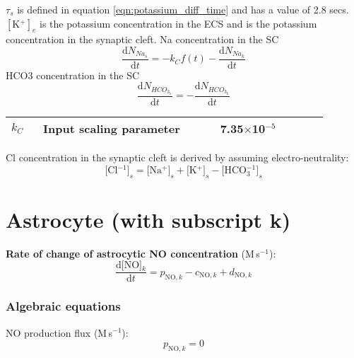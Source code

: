 \documentclass[fleqn]{report}
\numberwithin{equation}{section}
\numberwithin{equation}{section}
\newcommand{\Nas}{\text{[Na$^+]_{s}$}}
\newcommand{\K}{\text{K$^+$}}
\newcommand{\Ks}{\text{[K$^{+}]_s$}}
\newcommand{\Cls}{\text{[Cl$^{-1}]_s$}}
\newcommand{\HCOs}{\text{[HCO$_{3}^{-1}]_s$}}
\newcommand{\NOk}{\text{[NO]$_k$}}
\newcommand{\uMpers}{\textmu M\,s$^{-1}$}
\newcommand\pNO[1]{\text{$p_{\text{NO},#1}$}}
\newcommand\cNO[1]{\text{$c_{\text{NO},#1}$}}
\newcommand\dNO[1]{\text{$d_{\text{NO},#1}$}}
\begin{document}
		$\tau_{s}$ is defined in equation \ref{eqn:potassium_diff_time} and has a value of 2.8 secs. $[\K]_{e} $ is the potassium concentration in the ECS and \Ks is the potassium concentration in the synaptic cleft. 
		\gls{Na} concentration in the \gls{SC}  
		\begin{equation} \label{eq:NaEx}
		\dfrac{\mathrm{d}N_{Na_s}}{\mathrm{d}t}= - k_C f(t) -\dfrac{\mathrm{d}N_{Na_k}}{\mathrm{d}t}
		\end{equation}
		\gls{HCO3} concentration in the SC  
		\begin{equation} \label{eq:HCOEx}
		\dfrac{\mathrm{d}N_{HCO_{3_{s}}}}{\mathrm{d}t}=-\dfrac{\mathrm{d}N_{HCO_{3_{k}}}}{\mathrm{d}t}
		\end{equation}
		\begin{table}[h!]
		\centering
		\begin{tabular}{ p{0.09\linewidth}  >{\footnotesize} p{0.5\linewidth}  >{\footnotesize} p{0.27\linewidth} >{\footnotesize} p{0.03\linewidth} }
		\hline
		$ k_C $  & Input scaling parameter & 7.35$\times$10$^{-5}$ \muMps & \cite{Ostby2009} \\
		\hline
		\end{tabular}
		\end{table}
		
		\gls{Cl} concentration in the synaptic cleft  is derived by assuming electro-neutrality: 
		\begin{equation} \label{eq:ClEx}
		\Cls= \Nas+\Ks-\HCOs
		\end{equation}
		
	

	
	\section{Astrocyte (with subscript k)}
	\textbf{Rate of change of astrocytic NO concentration }(\uMpers):
	       		\begin{equation}  
	      			 \dfrac{\mathrm{d}\NOk}{\mathrm{d}t} = \pNO{k} - \cNO{k} + \dNO{k}
				\end{equation}   
	
			\subsubsection*{Algebraic equations}
				NO production flux (\uMpers):
				\begin{equation} 
					\pNO{k} = 0
				\end{equation}
			
\end{document}
